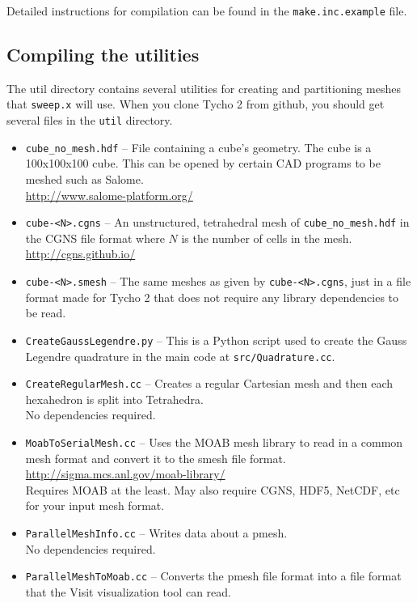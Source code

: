 \documentclass[12pt,letterpaper]{article}
\begin{document}
Detailed instructions for compilation can be found in the {\tt make.inc.example} file.


\subsection{Compiling the utilities}
The util directory contains several utilities for creating and partitioning meshes that {\tt sweep.x} will use.
When you clone Tycho 2 from github, you should get several files in the {\tt util} directory.
\begin{itemize}
\item {\tt cube\_no\_mesh.hdf} -- File containing a cube's geometry.  The cube is a 100x100x100 cube.  This can be opened by certain CAD programs to be meshed such as Salome.\\
\url{http://www.salome-platform.org/}
\item {\tt cube-<N>.cgns} -- An unstructured, tetrahedral mesh of {\tt cube\_no\_mesh.hdf} in the CGNS file format where $N$ is the number of cells in the mesh. \\
\url{http://cgns.github.io/}
\item {\tt cube-<N>.smesh} -- The same meshes as given by {\tt cube-<N>.cgns}, just in a file format made for Tycho 2 that does not require any library dependencies to be read.
\item {\tt CreateGaussLegendre.py} -- This is a Python script used to create the Gauss Legendre quadrature in the main code at {\tt src/Quadrature.cc}.
\item {\tt CreateRegularMesh.cc} -- Creates a regular Cartesian mesh and then each hexahedron is split into Tetrahedra. \\
{\color{red} No dependencies required.}
\item {\tt MoabToSerialMesh.cc} -- Uses the MOAB mesh library to read in a common mesh format and convert it to the smesh file format. \\
\url{http://sigma.mcs.anl.gov/moab-library/} \\
{\color{red} Requires MOAB at the least.  May also require CGNS, HDF5, NetCDF, etc for your input mesh format.}
\item {\tt ParallelMeshInfo.cc} -- Writes data about a pmesh.\\
{\color{red} No dependencies required.}
\item {\tt ParallelMeshToMoab.cc} -- Converts the pmesh file format into a file format that the Visit visualization tool can read.\\

\end{itemize}
\end{document}
